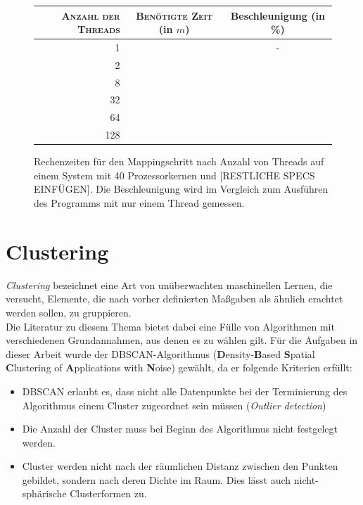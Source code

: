 \begin{figure}[h]
  \centering
  \begin{tabular}{r|cc}
    \textsc{Anzahl der Threads} & \textsc{Benötigte Zeit} (in $m$) & Beschleunigung (in \%) \\
    \hline
    1 & & - \\
    2 & & \\
    8 & & \\
    32 & & \\
    64 & & \\
    128 & & \\
  \end{tabular}
  \caption[Rechenzeiten für den Mappingschritt nach Anzahl von Threads]{Rechenzeiten für den Mappingschritt nach Anzahl von Threads auf
  einem System mit 40 Prozessorkernen und [RESTLICHE SPECS EINFÜGEN]. Die Beschleunigung wird im Vergleich zum Ausführen des Programms
  mit nur einem Thread gemessen.}
\end{figure}

\section{Clustering}

\emph{Clustering} bezeichnet eine Art von unüberwachten maschinellen Lernen,
die versucht, Elemente, die nach vorher definierten Maßgaben als ähnlich erachtet
werden sollen, zu gruppieren.\\
Die Literatur zu diesem Thema bietet dabei eine Fülle von Algorithmen mit verschiedenen
Grundannahmen, aus denen es zu wählen gilt. Für die Aufgaben in dieser Arbeit wurde
der DBSCAN-Algorithmus (\textbf{D}ensity-\textbf{B}ased \textbf{S}patial \textbf{C}lustering of
\textbf{A}pplications with \textbf{N}oise) gewählt, da er folgende Kriterien erfüllt:
\begin{itemize}
  \item DBSCAN erlaubt es, dass nicht alle Datenpunkte bei der
  Terminierung des Algorithmus einem Cluster zugeordnet sein müssen (\emph{Outlier detection})
  \item Die Anzahl der Cluster muss bei Beginn des Algorithmus nicht festgelegt werden.
  \item Cluster werden nicht nach der räumlichen Distanz zwischen den Punkten gebildet, sondern nach deren
  Dichte im Raum. Dies lässt auch nicht-sphärische Clusterformen zu.
\end{itemize}


